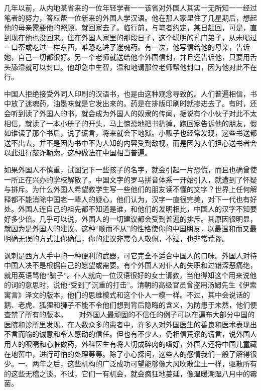 \documentclass[12pt,oneside]{book}
\begin{document}
\begin{common-format}
几年以前，从内地某省来的一位年轻学者一一该省对外国人其实一无所知一一经过笔者的努力，答应帮一位新来的外国人学汉语。他在那人家里住了几星期后，想起他的母亲需要他的照顾，就回家去了。临行前，与笔者约定，某日赶回，可是，直到现在他也没回来。住在外国人家里的那段日子，这个聪明的孔门弟子，从未喝过一口茶或吃过一样东西，唯恐吃进了迷魂药。有一次，他写信给他的母亲，告诉她，自己一切都很好。另一个老师就送给他个外国信封，并且还告诉他，只要用舌头舔湿就可以封口。他却急中生智，温和地请那位老师帮他封口，因为他对此不在行。 

中国人拒绝接受外同人印刷的汉语书，也是由这种观念导致的。人们普遍相信，书中放了迷魂药，油墨味就是它发出来的。药是在排版印刷时就掺进去了。有时，还会听到读了外国人的书，就会成为外国人的奴隶的传闻，据说有个小伙子对此不太相信，就读了一本小册子的开头，马上惊恐地把书扔掉，跑回家告诉他的朋友，假如谁读了那个书后，说了谎言，将来就会下地狱。小贩子也经常发现，这些书送都送不出去，并不是因为书中不为人知的内容受到敌视，而是因为人们担心送书者会以此进行敲诈勒索，这种做法在中国相当普遍。 

如果外国人不慎重，试图记下一些孩子的名字，就会引起一片恐慌，而且也确曾使一所正在兴办的学校解散了。中国文字的罗马拼音体系一开始引入，就遭到了怀疑与排斥。为什么外国人希望教学生写一些他们的朋友读不懂的文字？世界上任何解释都不能消除中国老一辈人的疑心，他们认为，汉字一直很完美，对下一代也有好处。外国人连自己的祖先都不知道是谁，和他们的发明相比，中国人的汉字不知要好多少倍。几乎可以说，外国人的一切建议都会受到普遍的排斥。其原因很明显，就因为是外国人的建议。这种“顺而不从”的性格使你的中国朋友，以最温和而又最明确无误的方式让你确信，你的建议非常令人敬佩，不过，也非常荒谬。 

讽刺是西方人手中的一种便利的武器，可它完全不适合中国人的口味。外国人对待中国人决不是根据自己的愿望或需要。有个外国人对仆人的失职和过错深恶痛绝，就用英语骂他“骗子”。仆人就向一位汉语很好的女士请教，当他得知这个用来说他的词的意思时，说他“受到了沉重的打击”。清朝的高级官员曾盗用汤姆先生《伊索寓言》泽文的版本，他们的思维模式和这个仆人一模一样。不过，其中会说话的鹅、老虎、狐狸和狮子不能不令他们想到背后隐晦的含义，为防患于未然，他们便查禁了所有的版本。 
　
对外国人最顽固的不信任的例子可以在遍布大部分中国的医院和诊所里发现。在人数众多的患者中，许多人对外国医生的善良和医术表现出不言而喻的诚意和令人感动的信任。但也有不少人，仍相信荒谬的谎言，说外国人用人的眼睛和心脏做药，外科医生有将人切成碎肉的嗜好，外国人还将中国儿童藏在地窖中，进行可怕的处理等等。除了小心探问，这些人的感情我们一般了解得很少。一、两年之后，这些机构的广泛成功可望能够像大风吹散尘土一样，驱散所有的这些无稽之谈。不过，它们一有机会，就会疯狂地蔓延，像温暖潮湿八月中的霉菌。 


\end{common-format}
\end{document}
